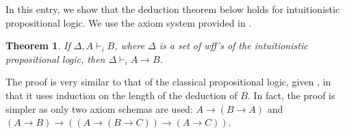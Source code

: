 \documentclass[12pt]{article}
\newtheorem{thm}{Theorem}
\begin{document}
In this entry, we show that the deduction theorem below holds for intuitionistic propositional logic.  We use the axiom system provided in .

\begin{thm} If $\Delta, A \vdash_i B$, where $\Delta$ is a set of wff's of the intuitionistic propositional logic, then $\Delta \vdash_i A\to B$. \end{thm}

The proof is very similar to that of the classical propositional logic, given , in that it uses induction on the length of the deduction of $B$.  In fact, the proof is simpler as only two axiom schemas are used: $A\to (B\to A)$ and $(A\to B) \to ((A\to (B\to C)) \to (A\to C))$. 
\end{document}

